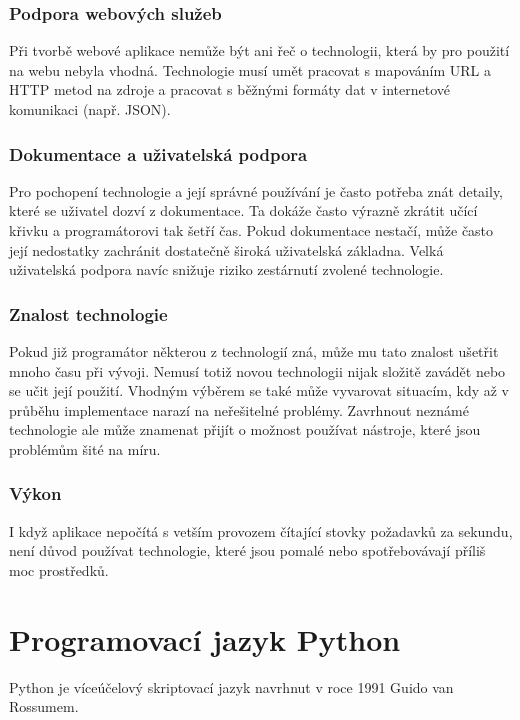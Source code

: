\documentclass[thesis=B,czech]{FITthesis}[2012/06/26]
\begin{document}
\subsubsection*{Podpora webových služeb}
Při tvorbě webové aplikace nemůže být ani řeč o technologii, která by pro použití na webu nebyla vhodná. Technologie musí
umět pracovat s mapováním URL a HTTP metod na zdroje a pracovat s běžnými formáty dat v internetové komunikaci (např. JSON).

\subsubsection*{Dokumentace a uživatelská podpora}
Pro pochopení technologie a její správné používání je často potřeba znát detaily, které se uživatel dozví z dokumentace.
Ta dokáže často výrazně zkrátit učící křivku a programátorovi tak šetří čas. Pokud dokumentace nestačí, může často její
nedostatky zachránit dostatečně široká uživatelská základna. Velká uživatelská podpora navíc snižuje riziko zestárnutí zvolené technologie.

\subsubsection*{Znalost technologie}
Pokud již programátor některou z technologií zná, může mu tato znalost ušetřit mnoho času při vývoji. Nemusí totiž novou technologii
nijak složitě zavádět nebo se učit její použití. Vhodným výběrem se také může vyvarovat situacím, kdy až v průběhu implementace narazí
na neřešitelné problémy. Zavrhnout neznámé technologie ale může znamenat přijít o možnost používat nástroje, které jsou problémům šité na míru. 

\subsubsection*{Výkon}
I když aplikace nepočítá s vetším provozem čítající stovky požadavků za sekundu, není důvod používat technologie, které jsou pomalé
nebo spotřebovávají příliš moc prostředků.

\section{Programovací jazyk Python}
Python je víceúčelový skriptovací jazyk navrhnut v roce 1991 Guido van Rossumem. 

\end{document}
